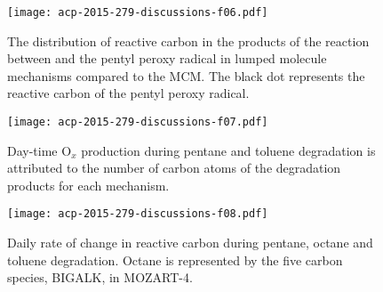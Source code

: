 \documentclass[acpd, online, hvmath]{copernicus}
\begin{document}
\begin{figure}[t]
    \texttt{[image: acp-2015-279-discussions-f06.pdf]}
    \caption{The distribution of reactive carbon in the products of
      the reaction between  and the pentyl peroxy radical in
      lumped molecule mechanisms compared to the MCM. The black dot
      represents the reactive carbon of the pentyl peroxy radical.}
    \label{f:HC5P_NO}
\end{figure}
\begin{figure}[t]
    \texttt{[image: acp-2015-279-discussions-f07.pdf]}
    \caption{Day-time O$_{x}$ production during pentane and toluene
      degradation is attributed to the number of carbon atoms of the
      degradation products for each mechanism.}
    \label{f:carbon}
\end{figure}
\begin{figure}[t]
    \texttt{[image: acp-2015-279-discussions-f08.pdf]}
    \caption{Daily rate of change in reactive carbon during pentane,
      octane and toluene degradation. Octane is represented by the
      five carbon species, BIGALK, in MOZART-4.}
    \label{f:net_carbon_loss}
\end{figure}
\end{document}
